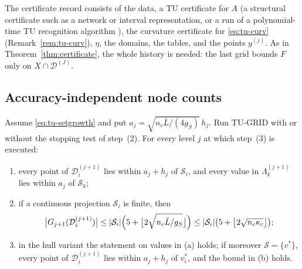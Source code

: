The certificate record consists of the data, a TU certificate for $A$
(a structural certificate such as a network or interval representation, or a
run of a polynomial-time TU recognition algorithm \cite[Chapter~20]{Schrijver1986}),
the curvature certificate for \eqref{eq:tu-curv} (Remark~\ref{rem:tu-curv}), $\eta$, the domains, the
tables, and the points $y^{(j)}$. As in Theorem~\ref{thm:certificate}, the
whole history is needed: the last grid bounds $F$ only on
$X\cap\mathcal D^{(J)}$.

\subsection{Accuracy-independent node counts}\label{sec:tu-states}

\begin{theorem}\label{thm:tu-states}
Assume \eqref{eq:tu-setgrowth} and put $a_j=\sqrt{n_c\bar L/(4g_S)}\,h_j$.
Run TU-GRID with or without the stopping test of step~(2). For every level
$j$ at which step~(3) is executed:
\begin{enumerate}[label=(\alph*)]
\item every point of $\mathcal D^{(j+1)}_i$ lies within $a_j+h_j$ of
$\mathcal S_i$, and every value in $\Lambda^{(j+1)}_k$ lies within $a_j$ of
$\mathcal S_k$;
\item if a continuous projection $\mathcal S_i$ is finite, then
\[
\bigl\lvert G_{j+1}(\mathcal D^{(j+1)}_i)\bigr\rvert\le
\lvert\mathcal S_i\rvert\Bigl(5+\bigl\lfloor2\sqrt{n_c\bar L/g_S}\bigr\rfloor\Bigr)
\le\lvert\mathcal S_i\rvert\bigl(5+\bigl\lfloor2\sqrt{n_c\kappa_c}\bigr\rfloor\bigr);
\]
\item in the hull variant the statement on values in (a) holds; if moreover
$\mathcal S=\{v^*\}$, every point of $\mathcal D^{(j+1)}_i$ lies within
$a_j+h_j$ of $v^*_i$, and the bound in (b) holds.
\end{enumerate}
\end{theorem}

